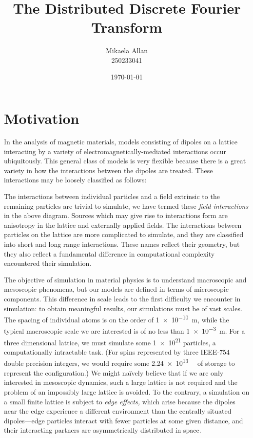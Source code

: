 \documentclass{article}
\author{Mikaela Allan\\250233041}
\date{\today}
\title{The Distributed Discrete Fourier Transform}
\theoremstyle{definition}
\begin{document}
\maketitle

\tableofcontents

\section{Motivation}
In the analysis of magnetic materials, models consisting of dipoles on a lattice
interacting by a variety of electromagnetically-mediated interactions occur
ubiquitously. This general class of models is very flexible because there is a
great variety in how the interactions between the dipoles are treated. These
interactions may be loosely classified as follows:


The interactions between individual particles and a field extrinsic to the
remaining particles are trivial to simulate, we have termed these \emph{field
interactions} in the above diagram. Sources which may give rise to interactions
form are anisotropy in the lattice and externally applied fields. The
interactions between particles on the lattice are more complicated to simulate,
and they are classified into short and long range interactions. These names
reflect their geometry, but they also reflect a fundamental difference in
computational complexity encountered their simulation.

The objective of simulation in material physics is to understand macroscopic and
mesoscopic phenomena, but our models are defined in terms of microscopic
components. This difference in scale leads to the first difficulty we encounter
in simulation: to obtain meaningful results, our simulations must be of vast
scales. The spacing of individual atoms is on the order of
\SI{1e-10}{\meter}, while the typical macroscopic scale we are interested is of
no less than \SI{1e-3}{m}. For a three dimensional lattice, we must simulate
some \num{1e21} particles, a computationally intractable task. (For spins
represented by three IEEE-754 double precision integers, we would require some
\SI{2.24e13}{\gibi\byte} of storage to represent the configuration.) We might
naïvely believe that if we are only interested in mesoscopic dynamics, such a
large lattice is not required and the problem of an impossibly large lattice is
avoided. To the contrary, a simulation on a small finite lattice is subject to
\emph{edge effects,} which arise because the dipoles near the edge experience a
different environment than the centrally situated dipoles---edge particles
interact with fewer particles at some given distance, and their interacting
partners are asymmetrically distributed in space.
\end{document}
